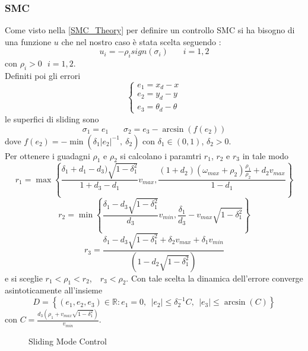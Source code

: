 \subsubsection{SMC}
Come visto nella \autoref{SMC_Theory} per definire un controllo SMC si ha bisogno di una funzione $u$ che nel nostro caso è stata scelta seguendo \cite{algoSMC}: 
\begin{equation}
        u_i=-\rho_{i}sign(\sigma_i)\: \: \: \: \: \: \: \:i=1,2
\end{equation}
con $\rho_i>0 \: \: \:i=1,2$. \\
Definiti poi gli errori 
\begin{equation}
\begin{cases}
    e_1=x_d-x 
   \\
   e_2=y_d-y
   \\
   e_3=\theta_d-\theta
\end{cases} 
\end{equation}
le superfici di sliding sono
\begin{equation}
       \sigma_1=e_1 \ \ \ \ \ \ \ \ \sigma_2=e_3-\arcsin(f(e_2))
\end{equation} 
dove $f(e_2)=-\min({\delta_1|e_2|^{-1},\ \delta_2})$ con $\delta_1 \in (0,1)$, $\delta_2>0$.\\ Per ottenere i guadagni $\rho_1$ e $\rho_2$ si calcolano i paramtri  $r_1$, $r_2$ e $r_3$ in tale modo
\begin{equation}
        r_1= \max\left\{\frac{\delta_1+d_1-d_3)\sqrt{1-\delta_1^{2}}}{1+d_3-d_1}v_{max}, \frac{(1+d_2)(\omega_{max}+\rho_2) \frac{\rho_1}{\rho_2}+d_2v_{max}}{1-d_1}\right\}
\end{equation}
\begin{equation}
        r_2= \min\left\{\frac{\delta_1-d_3\sqrt{1-\delta_1^{2}}}{d_3}v_{min}, \frac{\delta_1}{d_3}-v_{max}\sqrt{1-\delta_1^{2}}\right\}
\end{equation}
\begin{equation}
        r_3= \frac{\delta_1-d_3\sqrt{1-\delta_1^{2}}+\delta_2v_{max}+\delta_1v_{min}}{(1-d_2\sqrt{1-\delta_1^{2}})}
\end{equation}
e si sceglie $r_1<\rho_1<r_2$,\ \ $r_3<\rho_2$. Con tale scelta la dinamica dell'errore converge asintoticamente all'insieme
\begin{equation}
        D=\left\{(e_1,e_2,e_3) \in \mathbb{R}: e_1=0, \ \  |e_2|\le\delta_2^{-1}C, \ \ |e_3|\le \arcsin{(C)} \right\}
\end{equation}
con $C=\frac{d_3(\rho_1+v_{max}\sqrt{1-\delta_1^{2}})}{v_{min}}$.
\begin{figure} [H]
    \centering
    
    \caption{Sliding Mode Control}
    \label{fig:SMC}
\end{figure}


